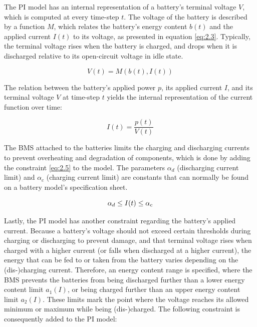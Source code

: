 The PI model has an internal representation of a battery's terminal voltage $V$, which is computed at every time-step $t$. The voltage of the battery is described by a function $M$, which relates the battery's energy content $b(t)$ and the applied current $I(t)$ to its voltage, as presented in equation \ref{eq:2.3}. Typically, the terminal voltage rises when the battery is charged, and drops when it is discharged relative to its open-circuit voltage in idle state.

\begin{equation}\label{eq:2.3}
   V(t) = M(b(t), I(t)) 
\end{equation}

The relation between the battery's applied power $p$, its applied current $I$, and its terminal voltage $V$ at time-step $t$ yields the internal representation of the current function over time:

\begin{equation} \label{eq:2.4}
    I(t) = \frac{p(t)}{V(t)}
\end{equation}

The BMS attached to the batteries limits the charging and discharging currents to prevent overheating and degradation of components, which is done by adding the constraint \ref{eq:2.5} to the model. The parameters $\alpha_d$ (discharging current limit) and $\alpha_c$ (charging current limit) are constants that can normally be found on a battery model's specification sheet.

\begin{equation} \label{eq:2.5}
    \alpha_d \le I(t) \le \alpha_c \\
\end{equation}

Lastly, the PI model has another constraint regarding the battery's applied current. Because a battery's voltage should not exceed certain thresholds during charging or discharging to prevent damage, and that terminal voltage rises when charged with a higher current (or falls when discharged at a higher current), the energy that can be fed to or taken from the battery varies depending on the (dis-)charging current. Therefore, an energy content range is specified, where the BMS prevents the batteries from being discharged further than a lower energy content limit $a_1(I)$, or being charged further than an upper energy content limit $a_2(I)$. These limits mark the point where the voltage reaches its allowed minimum or maximum while being (dis-)charged. The following constraint is consequently added to the PI model:

